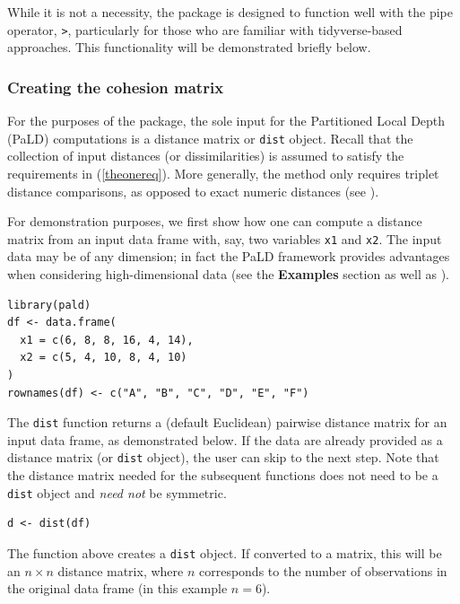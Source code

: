 While it is not a necessity, the  package is designed to function well with the pipe operator, \texttt{\textbar{}\textgreater{}}, particularly for those who are familiar with tidyverse-based approaches. This functionality will be demonstrated briefly below.

\hypertarget{creating-the-cohesion-matrix}{%
\subsubsection{Creating the cohesion matrix}\label{creating-the-cohesion-matrix}}

For the purposes of the  package, the sole input for the Partitioned Local Depth (PaLD) computations is a distance matrix or \texttt{dist} object. Recall that the collection of input distances (or dissimilarities) is assumed to satisfy the requirements in (\ref{theonereq}). More generally, the method only requires triplet distance comparisons, as opposed to exact numeric distances (see \citet{berenhaut2022social}).

For demonstration purposes, we first show how one can compute a distance matrix from an input data frame with, say, two variables \texttt{x1} and \texttt{x2}. The input data may be of any dimension; in fact the PaLD framework provides advantages when considering high-dimensional data (see the \textbf{Examples} section as well as \citet{berenhaut2022social}).

\begin{verbatim}
library(pald)
df <- data.frame(
  x1 = c(6, 8, 8, 16, 4, 14),
  x2 = c(5, 4, 10, 8, 4, 10)
)
rownames(df) <- c("A", "B", "C", "D", "E", "F")
\end{verbatim}

The \texttt{dist} function returns a (default Euclidean) pairwise distance matrix for an input data frame, as demonstrated below. If the data are already provided as a distance matrix (or \texttt{dist} object), the user can skip to the next step. Note that the distance matrix needed for the subsequent functions does not need to be a \texttt{dist} object and \emph{need not} be symmetric.

\begin{verbatim}
d <- dist(df)
\end{verbatim}

The function above creates a \texttt{dist} object. If converted to a matrix, this will be an \(n\times n\) distance matrix, where \(n\) corresponds to the number of observations in the original data frame (in this example \(n = 6\)).

